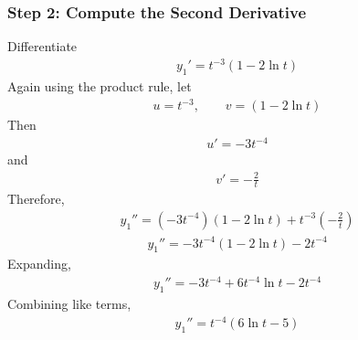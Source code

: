 \documentclass[letterpaper,10pt,english]{sphinxmanual}
\begin{document}
\subsubsection{Step 2: Compute the Second Derivative}
\label{\detokenize{Language/Science_language/ODE_calculus/course_MATH_3035/homework_assignments/index_pdf:step-2-compute-the-second-derivative}}
\sphinxAtStartPar
Differentiate
\begin{equation*}
\begin{split}y_1'
=
t^{-3}(1-2\ln t)\end{split}
\end{equation*}
\sphinxAtStartPar
Again using the product rule, let
\begin{equation*}
\begin{split}u=t^{-3},
\qquad
v=(1-2\ln t)\end{split}
\end{equation*}
\sphinxAtStartPar
Then
\begin{equation*}
\begin{split}u'=-3t^{-4}\end{split}
\end{equation*}
\sphinxAtStartPar
and
\begin{equation*}
\begin{split}v'=-\frac{2}{t}\end{split}
\end{equation*}
\sphinxAtStartPar
Therefore,
\begin{equation*}
\begin{split}y_1''
=
(-3t^{-4})(1-2\ln t)
+
t^{-3}\left(-\frac{2}{t}\right)\end{split}
\end{equation*}\begin{equation*}
\begin{split}y_1''
=
-3t^{-4}(1-2\ln t)-2t^{-4}\end{split}
\end{equation*}
\sphinxAtStartPar
Expanding,
\begin{equation*}
\begin{split}y_1''
=
-3t^{-4}+6t^{-4}\ln t-2t^{-4}\end{split}
\end{equation*}
\sphinxAtStartPar
Combining like terms,
\begin{equation*}
\begin{split}y_1''
=
t^{-4}(6\ln t-5)\end{split}
\end{equation*}
\end{document}
